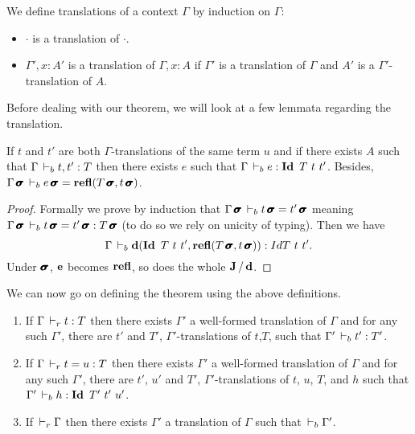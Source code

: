 \documentclass[a4paper,english]{lipics-utf8x}
\begin{document}
  \begin{definition}
    We define translations of a context $\Gamma$ by induction on $\Gamma$:
    \begin{itemize}
      \item $\cdot$ is a translation of $\cdot$.
      \item $\Gamma', x:A'$ is a translation of $\Gamma, x:A$ if $\Gamma'$ is
            a translation of $\Gamma$ and $A'$ is a $\Gamma'$-translation of
            $A$.
    \end{itemize}
  \end{definition}
  Before dealing with our theorem, we will look at a few lemmata regarding the
  translation.

  \begin{lemma}
    \label{lem:transleq}
    If $t$ and $t'$ are both $\Gamma$-translations of the same term $u$ and if
    there exists $A$ such that $\Gamma \,\vdash_b t, t' : T$ then there exists $e$
    such that $\Gamma \derb e : \Id T\ t\ t'$.
    Besides, $\Gamma \operatorname{\pmb{\bm{\sigma}}} \,\vdash_b e \operatorname{\pmb{\bm{\sigma}}} = \operatorname{\mathbf{refl}}(T\operatorname{\pmb{\bm{\sigma}}},t\operatorname{\pmb{\bm{\sigma}}})$.
  \end{lemma}

  \begin{proof}
    Formally we prove by induction that
    $\Gamma \operatorname{\pmb{\bm{\sigma}}} \,\vdash_b t \operatorname{\pmb{\bm{\sigma}}} = t' \operatorname{\pmb{\bm{\sigma}}}$
    meaning $\Gamma \operatorname{\pmb{\bm{\sigma}}} \,\vdash_b t \operatorname{\pmb{\bm{\sigma}}} = t' \operatorname{\pmb{\bm{\sigma}}} : T\operatorname{\pmb{\bm{\sigma}}}$
    (to do so we rely on unicity of typing).
    Then we have
    \[
      \Gamma \,\vdash_b \operatorname{\mathbf{d}}(\operatorname{\mathbf{Id}~} T\ t\ t', \operatorname{\mathbf{refl}}(T\operatorname{\pmb{\bm{\sigma}}}, t\operatorname{\pmb{\bm{\sigma}}})) : Id T\ t\ t'.
    \]
    Under $\operatorname{\pmb{\bm{\sigma}}}$, $\operatorname{\mathbf{e}}$ becomes $\operatorname{\mathbf{refl}}$, so does the whole $\operatorname{\mathbf{J}}/\operatorname{\mathbf{d}}$.
  \end{proof}


  We can now go on defining the theorem using the above definitions.

  \begin{theorem}[Translation]
    \label{thm:transl}
    \leavevmode
    \begin{enumerate}
      \item If $\Gamma \,\vdash_r t : T$ then there exists $\Gamma'$ a well-formed
      translation of $\Gamma$ and for any such $\Gamma'$, there are $t'$ and
      $T'$, $\Gamma'$-translations of $t$,$T$,
      such that $\Gamma' \,\vdash_b t' : T'$.
      \item If $\Gamma \,\vdash_r t = u : T$ then there exists $\Gamma'$ a
      well-formed translation of $\Gamma$ and for any such $\Gamma'$, there are
      $t'$, $u'$ and $T'$, $\Gamma'$-translations of $t$, $u$, $T$, and $h$ such
      that $\Gamma' \derb h : \Id T'\ t'\ u'$.
      \item If $\,\vdash_r \Gamma$ then there exists $\Gamma'$ a translation of
      $\Gamma$ such that $\,\vdash_b \Gamma'$.
    \end{enumerate}
  \end{theorem}
\end{document}
